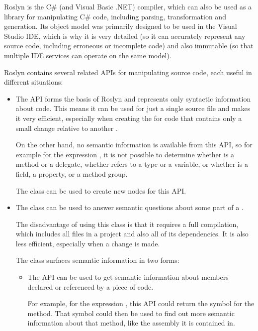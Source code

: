 Roslyn \cite{roslyn} is the C\# (and Visual Basic .NET) compiler, which can also be used as a library for manipulating C\# code, including parsing, transformation and generation. Its object model was primarily designed to be used in the Visual Studio \ac{IDE}, which is why it is very detailed (so it can accurately represent any source code, including erroneous or incomplete code) and also immutable (so that multiple \ac{IDE} services can operate on the same model).

Roslyn contains several related \acp{API} for manipulating source code, each useful in different situations:

\begin{itemize}
\item The  \ac{API} forms the basis of Roslyn and represents only syntactic information about code. This means it can be used for just a single source file and makes it very efficient, especially when creating the  for code that contains only a small change relative to another .

On the other hand, no semantic information is available from this \ac{API}, so for example for the expression , it is not possible to determine whether  is a method or a delegate, whether  refers to a type or a variable, or whether  is a field, a property, or a method group.

The  class can be used to create new nodes for this \ac{API}.

\item The  class can be used to answer semantic questions about some part of a .

The disadvantage of using this class is that it requires a full compilation, which includes all files in a project and also all of its dependencies. It is also less efficient, especially when a change is made.

The  class surfaces semantic information in two forms:

\begin{itemize}
\item The  \ac{API} can be used to get semantic information about members declared or referenced by a piece of code.

For example, for the expression , this \ac{API} could return the symbol for the  method. That symbol could then be used to find out more semantic information about that method, like the assembly it is contained in.


\end{itemize}
\end{itemize}
